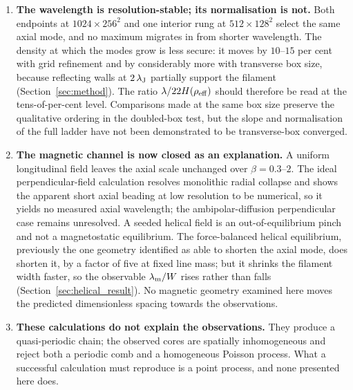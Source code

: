 \documentclass[usenatbib,twoside,twocolumn]{mnras}
\begin{document}
\begin{enumerate}
\item \textbf{The wavelength is resolution-stable; its normalisation is not.} Both endpoints at $1024\times256^2$ and one interior rung at $512\times128^2$ select the same axial mode, and no maximum migrates in from shorter wavelength. The density at which the modes grow is less secure: it moves by $10$--$15$ per cent with grid refinement and by considerably more with transverse box size, because reflecting walls at $2\,\lambda_{\rm J}$ partially support the filament (Section~\ref{sec:method}). The ratio $\lambda/22H(\rho_{\rm eff})$ should therefore be read at the tens-of-per-cent level. Comparisons made at the same box size preserve the qualitative ordering in the doubled-box test, but the slope and normalisation of the full ladder have not been demonstrated to be transverse-box converged.
\item \textbf{The magnetic channel is now closed as an explanation.} A uniform longitudinal field leaves the axial scale unchanged over $\beta=0.3$--$2$. The ideal perpendicular-field calculation resolves monolithic radial collapse and shows the apparent short axial beading at low resolution to be numerical, so it yields no measured axial wavelength; the ambipolar-diffusion perpendicular case remains unresolved. A seeded helical field is an out-of-equilibrium pinch and not a magnetostatic equilibrium. The force-balanced helical equilibrium, previously the one geometry identified as able to shorten the axial mode, does shorten it, by a factor of five at fixed line mass; but it shrinks the filament width faster, so the observable $\lambda_{\rm m}/W$ rises rather than falls (Section~\ref{sec:helical_result}). No magnetic geometry examined here moves the predicted dimensionless spacing towards the observations.
\item \textbf{These calculations do not explain the observations.} They produce a quasi-periodic chain; the observed cores are spatially inhomogeneous and reject both a periodic comb and a homogeneous Poisson process. What a successful calculation must reproduce is a point process, and none presented here does.
\end{enumerate}
\end{document}
